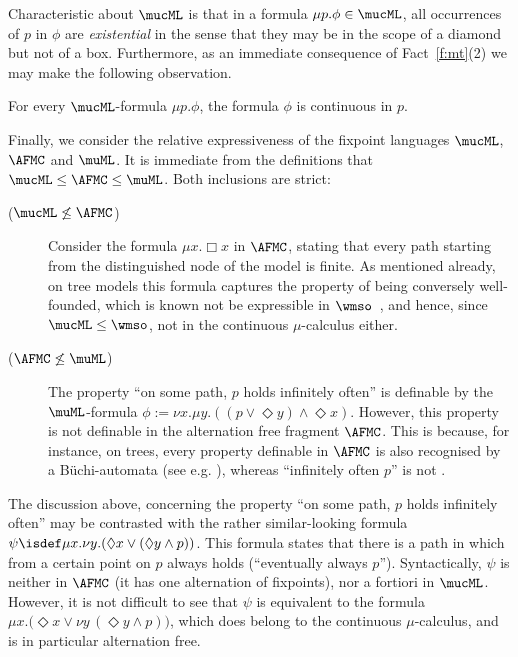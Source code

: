 Characteristic about $\mucML$ is that in a formula $\mu p. \phi \in \mucML$, all
occurrences of $p$ in $\phi$ are \emph{existential} in the sense that they may 
be in the scope of a diamond but not of a box.
Furthermore, as an immediate consequence of Fact~\ref{f:mt}(2) we may make the 
following observation.

\begin{corollary}\label{cor:cont}
For every $\mucML$-formula $\mu p. \phi$, the formula $\phi$ is continuous in $p$.
\end{corollary}


Finally, we consider the relative expressiveness of the fixpoint languages
$\mucML$, $\AFMC$ and $\muML$.
It is immediate from the definitions that $\mucML \leq \AFMC \leq \muML$. 
Both inclusions are strict:
\begin{description}
\item[($\mucML \not\leq \AFMC$)] 
Consider the formula $\mu x. \Box x$ in $\AFMC$, stating that every path 
starting from the distinguished node of the model is finite. 
As mentioned already, on tree models this formula captures the property of being
conversely well-founded, which is known not be expressible in 
$\wmso$~\cite{CateF11}, and
hence, since $\mucML \leq \wmso$, not in the continuous 
$\mu$-calculus either.
\item[($\AFMC \not\leq \muML$)] 
The property ``on some path, $p$ holds infinitely often'' is definable by the
$\muML$-formula $\phi:=\nu x. \mu y. (( p \lor \Diamond y) \land \Diamond x)$.
However, this property is not definable in the alternation free fragment $\AFMC$.
This is because, for instance, on trees, every property definable in $\AFMC$ is 
also recognised by a B\"uchi-automata (see e.g. \cite{KupfermanVardi03}), 
whereas  ``infinitely often $p$'' is not \cite{Rab70}.  
\end{description}

\begin{remark}
\label{r:evalwp}
The discussion above, concerning the property ``on some path, $p$ holds 
infinitely  often'' may be contrasted with the rather similar-looking formula 
$\psi \isdef \mu x. \nu y. ( \Diamond x \lor (\Diamond y \land p))$. 
This formula states that there is a path in which from a certain point on $p$ 
always holds (``eventually always $p$''). 
Syntactically, $\psi$ is neither in $\AFMC$ (it has one alternation of 
fixpoints), nor a fortiori in $\mucML$. 
However, it is not difficult to see that $\psi$ is equivalent to the formula
$\mu x. \big( \Diamond x \lor \nu y \, (\Diamond y \land p)\big)$, which does
belong to the continuous $\mu$-calculus, and is in particular alternation free.
\end{remark}


